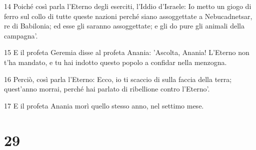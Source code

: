 \par 14 Poiché così parla l'Eterno degli eserciti, l'Iddio d'Israele: Io metto un giogo di ferro sul collo di tutte queste nazioni perché siano assoggettate a Nebucadnetsar, re di Babilonia; ed esse gli saranno assoggettate; e gli do pure gli animali della campagna'.
\par 15 E il profeta Geremia disse al profeta Anania: 'Ascolta, Anania! L'Eterno non t'ha mandato, e tu hai indotto questo popolo a confidar nella menzogna.
\par 16 Perciò, così parla l'Eterno: Ecco, io ti scaccio di sulla faccia della terra; quest'anno morrai, perché hai parlato di ribellione contro l'Eterno'.
\par 17 E il profeta Anania morì quello stesso anno, nel settimo mese.

\chapter{29}

